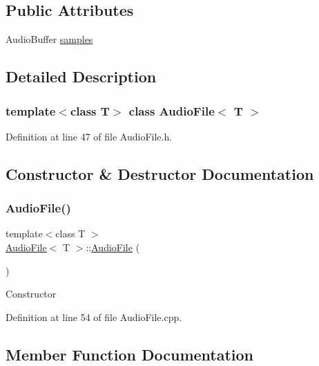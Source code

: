 \subsection*{Public Attributes}
\begin{DoxyCompactItemize}
\item 
Audio\+Buffer \hyperlink{classAudioFile_af937119db095c5af870851050dcbeabb}{samples}
\end{DoxyCompactItemize}


\subsection{Detailed Description}
\subsubsection*{template$<$class T$>$\newline
class Audio\+File$<$ T $>$}



Definition at line 47 of file Audio\+File.\+h.



\subsection{Constructor \& Destructor Documentation}
\mbox{\label{classAudioFile_ae74399e93d3f4623c7421ee10cfc0e15}} 
\subsubsection{\texorpdfstring{Audio\+File()}{AudioFile()}}
{\footnotesize\ttfamily template$<$class T $>$ \\
\hyperlink{classAudioFile}{Audio\+File}$<$ T $>$\+::\hyperlink{classAudioFile}{Audio\+File} (\begin{DoxyParamCaption}{ }\end{DoxyParamCaption})}

Constructor 

Definition at line 54 of file Audio\+File.\+cpp.



\subsection{Member Function Documentation}
\mbox{\label{classAudioFile_a5495d5cb55911de54f0714e219130b48}} 

